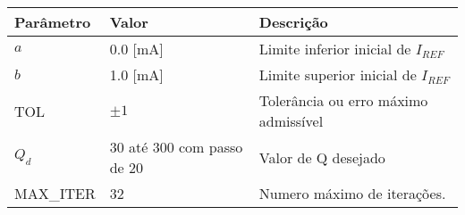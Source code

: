 \begin{tabular}{@{}lll@{}}
\toprule
\textbf{Parâmetro} & \textbf{Valor} & \textbf{Descrição}                   \\ \midrule
$a$                & 0.0 [mA]            & Limite inferior inicial de $I_{REF}$ \\
$b$                & 1.0 [mA]            & Limite superior inicial de $I_{REF}$ \\
TOL                & $\pm 1$       & Tolerância ou erro máximo admissível \\
$Q_d$              & 30 até 300 com passo de 20           & Valor de Q desejado                  \\
MAX\_ITER           & 32             & Numero máximo de iterações.          \\ \bottomrule
\end{tabular}
